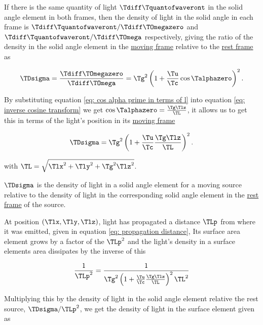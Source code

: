 \begin{derivation}
	If there is the same quantity of light $\Tdiff \Tquantofwaveront $ in the solid angle element in both frames, then the density of light in the solid angle in each frame is $\Tdiff \Tquantofwaveront /\Tdiff \TOmegazero $ and $\Tdiff \Tquantofwaveront /\Tdiff \TOmega $ respectively, giving the ratio of the density in the solid angle element in the \hyperlink{def-Moving-Frame}{moving frame} relative to the \hyperlink{def-proper-frame}{rest frame} as

	\begin{equation}
		\TDsigma  = \frac{\Tdiff \TOmegazero }{\Tdiff \TOmega } = \Tg ^2\left(1 + \dfrac{\Tu }{\Tc }\cos{\Talphazero }\right)^2.
	\end{equation}

	By substituting equation \eqref{eq: cos alpha prime in terms of l} into equation \eqref{eq: inverse cosine transform} we get $\cos\Talphazero =\frac{\Tg  \Tlz  }{\TL }$, it allows us to get this in terms of the light's position in its \hyperlink{def-Moving-Frame}{moving frame}

	\begin{equation}
		\TDsigma  = \Tg ^2 \left(1 + \dfrac{\Tu }{\Tc }\frac{\Tg  \Tlz  }{\TL }\right)^2.
	\end{equation}

	with $\TL  = \sqrt{\Tlx ^2 + \Tly ^2 + \Tg ^2 \Tlz ^2}$.

	$\TDsigma $ is the density of light in a solid angle element for a moving source relative to the density of light in the corresponding solid angle element in the \hyperlink{def-proper-frame}{rest frame} of the source.

\end{derivation}

At position $(\Tlx ,\Tly ,\Tlz )$, light has propagated a distance $\TLp $ from where it was emitted, given in equation \eqref{eq: propagation distance},
Its surface area element grows by a factor of the $\TLp ^2$ and the light's density in a surface elements area dissipates by the inverse of this

\begin{equation}
	\frac{1}{\TLp ^2} = \frac{1}{\Tg ^2 \left( 1 + \frac{\Tu }{\Tc } \frac{\Tg  \Tlz }{\TL } \right)^2 \TL ^2}
\end{equation}

Multiplying this by the density of light in the solid angle element relative the rest source, $\TDsigma /\TLp ^2$, we get the density of light in the surface element given as

